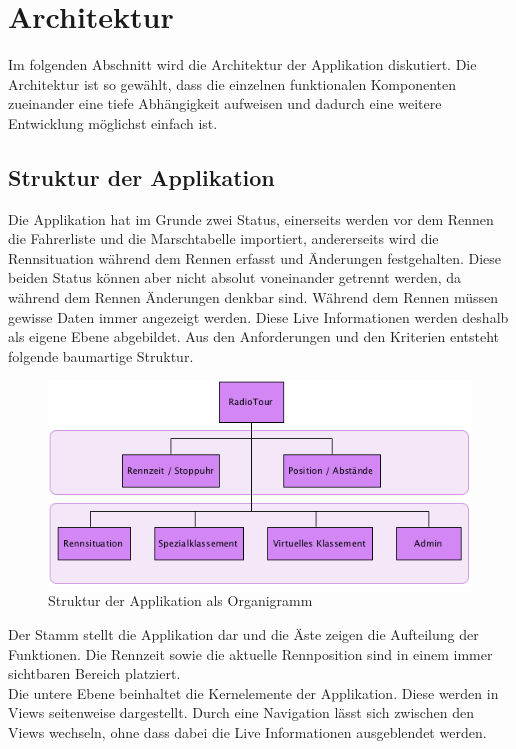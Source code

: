 \chapter{Architektur}
Im folgenden Abschnitt wird die Architektur der Applikation diskutiert. Die Architektur ist so gewählt, dass die einzelnen funktionalen Komponenten zueinander eine tiefe Abhängigkeit aufweisen und dadurch eine weitere Entwicklung möglichst einfach ist.

\section{Struktur der Applikation}
Die Applikation hat im Grunde zwei Status, einerseits werden vor dem Rennen die Fahrerliste und die Marschtabelle importiert, andererseits wird die Rennsituation während dem Rennen erfasst und Änderungen festgehalten. Diese beiden Status können aber nicht absolut voneinander getrennt werden, da während dem Rennen Änderungen denkbar sind. Während dem Rennen müssen gewisse Daten immer angezeigt werden. Diese Live Informationen werden deshalb als eigene Ebene abgebildet. Aus den Anforderungen und den Kriterien entsteht folgende baumartige Struktur.

\begin{figure}[h!]
\caption{Struktur der Applikation als Organigramm}
\centering
\includegraphics{05bericht/images/struktur.png}
\end{figure} 

Der Stamm stellt die Applikation dar und die Äste zeigen die Aufteilung der Funktionen. Die Rennzeit sowie die aktuelle Rennposition sind in einem immer sichtbaren Bereich platziert.
\\
Die untere Ebene beinhaltet die Kernelemente der Applikation. Diese werden in Views seitenweise dargestellt. Durch eine Navigation lässt sich zwischen den Views wechseln, ohne dass dabei die Live Informationen ausgeblendet werden.

